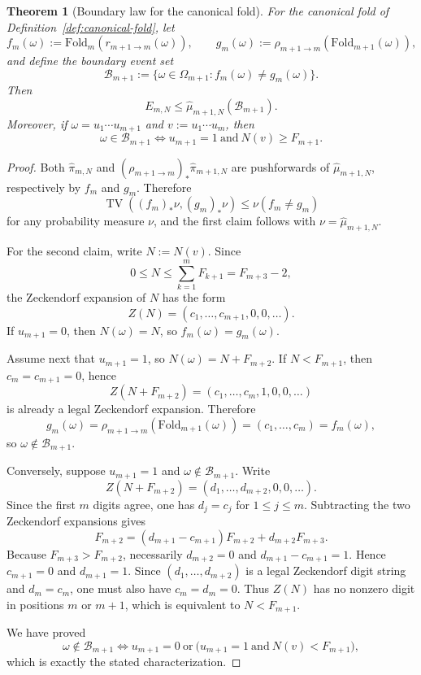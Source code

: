 \documentclass[11pt,letterpaper]{article}
\numberwithin{equation}{section}
\theoremstyle{plain}
\newtheorem{theorem}{Theorem}[section]
\theoremstyle{definition}
\theoremstyle{remark}
\newcommand{\Fold}{\mathrm{Fold}}
\DeclareMathOperator{\TV}{TV}
\begin{document}
\begin{theorem}[Boundary law for the canonical fold]\label{prop:multiscale-residual-by-boundary}
For the canonical fold of Definition~\ref{def:canonical-fold}, let
\[
f_m(\omega):=\Fold_m(r_{m+1\to m}(\omega)),
\qquad
g_m(\omega):=\rho_{m+1\to m}(\Fold_{m+1}(\omega)),
\]
and define the boundary event set
\[
\mathcal{B}_{m+1}:=\{\omega\in\Omega_{m+1}: f_m(\omega)\neq g_m(\omega)\}.
\]
Then
\[
E_{m,N}\le \hat\mu_{m+1,N}(\mathcal{B}_{m+1}).
\]
Moreover, if \(\omega=u_1\cdots u_{m+1}\) and \(v:=u_1\cdots u_m\), then
\[
\omega\in\mathcal{B}_{m+1}
\iff
u_{m+1}=1\ \text{and}\ N(v)\ge F_{m+1}.
\]
\end{theorem}

\begin{proof}
Both $\hat\pi_{m,N}$ and $(\rho_{m+1\to m})_*\hat\pi_{m+1,N}$ are pushforwards
of $\hat\mu_{m+1,N}$, respectively by $f_m$ and $g_m$.  Therefore
\[
\TV((f_m)_*\nu,(g_m)_*\nu)\le \nu(f_m\neq g_m)
\]
for any probability measure $\nu$, and the first claim follows with
$\nu=\hat\mu_{m+1,N}$.

For the second claim, write \(N:=N(v)\). Since
\[
0\le N\le \sum_{k=1}^m F_{k+1}=F_{m+3}-2,
\]
the Zeckendorf expansion of \(N\) has the form
\[
Z(N)=(c_1,\dots,c_{m+1},0,0,\dots).
\]
If \(u_{m+1}=0\), then \(N(\omega)=N\), so \(f_m(\omega)=g_m(\omega)\).

Assume next that \(u_{m+1}=1\), so \(N(\omega)=N+F_{m+2}\). If \(N<F_{m+1}\),
then \(c_m=c_{m+1}=0\), hence
\[
Z(N+F_{m+2})=(c_1,\dots,c_m,1,0,0,\dots)
\]
is already a legal Zeckendorf expansion. Therefore
\[
g_m(\omega)=\rho_{m+1\to m}(\Fold_{m+1}(\omega))=(c_1,\dots,c_m)=f_m(\omega),
\]
so \(\omega\notin\mathcal{B}_{m+1}\).

Conversely, suppose \(u_{m+1}=1\) and \(\omega\notin\mathcal{B}_{m+1}\). Write
\[
Z(N+F_{m+2})=(d_1,\dots,d_{m+2},0,0,\dots).
\]
Since the first \(m\) digits agree, one has \(d_j=c_j\) for \(1\le j\le m\).
Subtracting the two Zeckendorf expansions gives
\[
F_{m+2}
=
(d_{m+1}-c_{m+1})F_{m+2}+d_{m+2}F_{m+3}.
\]
Because \(F_{m+3}>F_{m+2}\), necessarily \(d_{m+2}=0\) and
\(d_{m+1}-c_{m+1}=1\). Hence \(c_{m+1}=0\) and \(d_{m+1}=1\). Since
\((d_1,\dots,d_{m+2})\) is a legal Zeckendorf digit string and \(d_m=c_m\), one
must also have \(c_m=d_m=0\). Thus \(Z(N)\) has no nonzero digit in positions
\(m\) or \(m+1\), which is equivalent to \(N<F_{m+1}\).

We have proved
\[
\omega\notin\mathcal{B}_{m+1}
\iff
u_{m+1}=0\ \text{or}\ \bigl(u_{m+1}=1\ \text{and}\ N(v)<F_{m+1}\bigr),
\]
which is exactly the stated characterization.
\end{proof}
\end{document}
